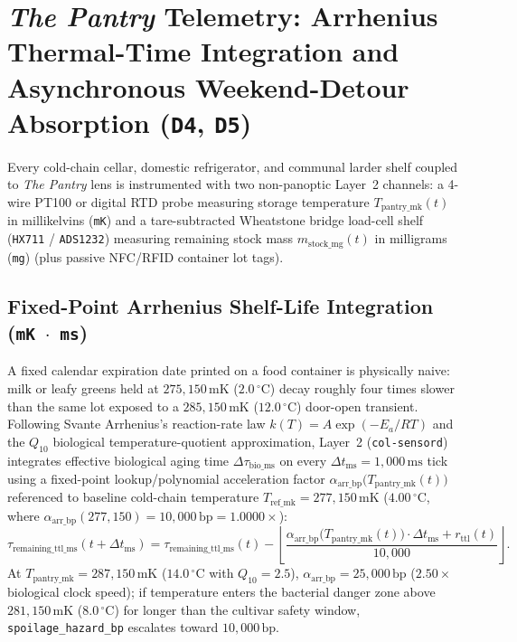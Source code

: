 \section{\textit{The Pantry} Telemetry: Arrhenius Thermal-Time Integration and Asynchronous Weekend-Detour Absorption (\texttt{D4}, \texttt{D5})}
\label{sec:l2-pantry-arrhenius-detour}

Every cold-chain cellar, domestic refrigerator, and communal larder shelf coupled to \textit{The Pantry} lens is instrumented with two non-panoptic Layer~2 channels: a 4-wire PT100 or digital RTD probe measuring storage temperature $T_{\mathrm{pantry\_mk}}(t)$ in millikelvins (\texttt{mK}) and a tare-subtracted Wheatstone bridge load-cell shelf (\texttt{HX711} / \texttt{ADS1232}) measuring remaining stock mass $m_{\mathrm{stock\_mg}}(t)$ in milligrams (\texttt{mg}) (plus passive NFC/RFID container lot tags).

\subsection{Fixed-Point Arrhenius Shelf-Life Integration (\texttt{mK $\cdot$ ms})}

A fixed calendar expiration date printed on a food container is physically naive: milk or leafy greens held at $275{,}150\,\mathrm{mK}$ ($2.0\,^\circ\mathrm{C}$) decay roughly four times slower than the same lot exposed to a $285{,}150\,\mathrm{mK}$ ($12.0\,^\circ\mathrm{C}$) door-open transient. Following Svante Arrhenius's reaction-rate law $k(T) = A \exp(-E_a / R T)$ \parencite{arrhenius1889reaction} and the $Q_{10}$ biological temperature-quotient approximation, Layer~2 (\texttt{col-sensord}) integrates effective biological aging time $\Delta \tau_{\mathrm{bio\_ms}}$ on every $\Delta t_{\mathrm{ms}} = 1{,}000\,\mathrm{ms}$ tick using a fixed-point lookup/polynomial acceleration factor $\alpha_{\mathrm{arr\_bp}}\bigl(T_{\mathrm{pantry\_mk}}(t)\bigr)$ referenced to baseline cold-chain temperature $T_{\mathrm{ref\_mk}} = 277{,}150\,\mathrm{mK}$ ($4.00\,^\circ\mathrm{C}$, where $\alpha_{\mathrm{arr\_bp}}(277{,}150) = 10{,}000\,\mathrm{bp} = 1.0000\times$):
\begin{equation}
    \tau_{\mathrm{remaining\_ttl\_ms}}(t + \Delta t_{\mathrm{ms}}) = \tau_{\mathrm{remaining\_ttl\_ms}}(t) - \left\lfloor \frac{\alpha_{\mathrm{arr\_bp}}\bigl(T_{\mathrm{pantry\_mk}}(t)\bigr) \cdot \Delta t_{\mathrm{ms}} + r_{\mathrm{ttl}}(t)}{10{,}000} \right\rfloor.
    \label{eq:l2-arrhenius-ttl}
\end{equation}
At $T_{\mathrm{pantry\_mk}} = 287{,}150\,\mathrm{mK}$ ($14.0\,^\circ\mathrm{C}$ with $Q_{10} = 2.5$), $\alpha_{\mathrm{arr\_bp}} = 25{,}000\,\mathrm{bp}$ ($2.50\times$ biological clock speed); if temperature enters the bacterial danger zone above $281{,}150\,\mathrm{mK}$ ($8.0\,^\circ\mathrm{C}$) for longer than the cultivar safety window, \texttt{spoilage\_hazard\_bp} escalates toward $10{,}000\,\mathrm{bp}$.

